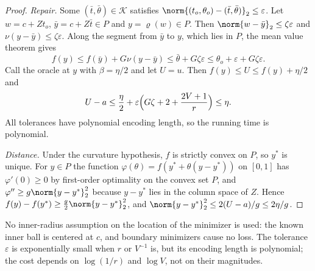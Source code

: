 \begin{proof}
\emph{Repair.} Some $(\bar t,\bar\theta)\in\mathcal K$ satisfies
$\norm{(t_o,\theta_o)-(\bar t,\bar\theta)}_2\le\varepsilon$. Let
$w=c+Zt_o$, $\bar y=c+Z\bar t\in P$ and $y=\varrho(w)\in P$. Then
$\norm{w-\bar y}_2\le\zeta\varepsilon$ and
$\nu(y-\bar y)\le\zeta\varepsilon$. Along the segment from $\bar y$ to $y$,
which lies in $P$, the mean value theorem gives
\[
 f(y)\le f(\bar y)+G\nu(y-\bar y)\le\bar\theta+G\zeta\varepsilon
 \le\theta_o+\varepsilon+G\zeta\varepsilon .
\]
Call the oracle at $y$ with $\beta=\eta/2$ and let $U=u$. Then
$f(y)\le U\le f(y)+\eta/2$ and
\[
 U-a\le\frac\eta2+\varepsilon\Bigl(G\zeta+2+\frac{2V+1}r\Bigr)\le\eta .
\]
All tolerances have polynomial encoding length, so the running time is
polynomial.

\emph{Distance.} Under the curvature hypothesis, $f$ is strictly convex on
$P$, so $y^*$ is unique. For $y\in P$ the function
$\varphi(\theta)=f(y^*+\theta(y-y^*))$ on $[0,1]$ has $\varphi'(0)\ge0$ by
first-order optimality on the convex set $P$, and
$\varphi''\ge g\norm{y-y^*}_2^2$ because $y-y^*$ lies in the column space of
$Z$. Hence $f(y)-f(y^*)\ge\frac g2\norm{y-y^*}_2^2$, and
$\norm{y-y^*}_2^2\le2(U-a)/g\le2\eta/g$.
\end{proof}

No inner-radius assumption on the location of the minimizer is used: the
known inner ball is centered at $c$, and boundary minimizers cause no loss.
The tolerance $\varepsilon$ is exponentially small when $r$ or $V^{-1}$ is,
but its encoding length is polynomial; the cost depends on $\log(1/r)$ and
$\log V$, not on their magnitudes.


